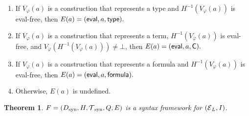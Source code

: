 \documentclass[11pt,fleqn]{article}
\newcommand{\be}{\begin{enumerate}}
\newcommand{\ee}{\end{enumerate}}
\newcommand{\bsp}{\begin{sloppypar}}
\newcommand{\esp}{\end{sloppypar}}
\newcommand{\sE}{\mbox{$\cal E$}}
\newcommand{\sT}{\mbox{$\cal T$}}
\renewcommand{\phi}{\varphi}
\newcommand{\mname}[1]{\mbox{\sf #1}}
\newcommand{\Undefined}{\bot}
\newtheorem{thm}{Theorem}[subsection]
\begin{document}
\be

  \item If $V_\phi(a)$ is a construction that
    represents a type and $H^{-1}(V_\phi(a))$ is eval-free, then 
    $E(a) = (\mname{eval},a,\mname{type}).$

  \item If $V_\phi(a)$ is a construction that represents a term,
    $H^{-1}(V_\phi(a))$ is eval-free, and
    $V_{\phi}(H^{-1}(V_{\phi}(a))) \not= \Undefined$, then $E(a) =
    (\mname{eval},a,\mname{C}).$

  \item If $V_\phi(a)$ is a construction that
    represents a formula and $H^{-1}(V_\phi(a))$ is eval-free, then 
    $E(a) = (\mname{eval},a,\mname{formula}).$

  \item Otherwise, $E(a)$ is undefined.

\ee

\begin{thm}
\bsp $F = (D_{\rm syn}, H, \sT_{\rm syn}, Q, E)$ is a syntax framework
for $(\sE_L,I)$.\esp
\end{thm}
\end{document}
